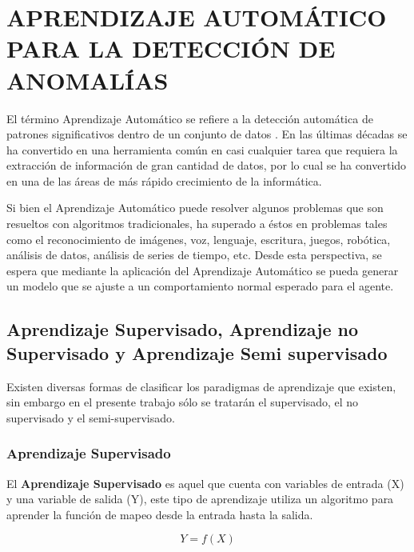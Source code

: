 \chapter{\uppercase{Aprendizaje Autom\'{a}tico para la detecci\'{o}n de anomal\'{i}as}}
\label{Capitulo 3}

El t\'{e}rmino Aprendizaje Autom\'{a}tico se refiere a la detecci\'{o}n autom\'{a}tica de patrones significativos dentro de un conjunto de datos \cite{Reference32}. En las \'{u}ltimas d\'{e}cadas se ha convertido en una herramienta com\'{u}n en casi cualquier tarea que requiera la extracci\'{o}n de informaci\'{o}n de gran cantidad de datos, por lo cual se ha convertido en una de las \'{a}reas de m\'{a}s r\'{a}pido crecimiento de la inform\'{a}tica.

\vspace{5mm} %

Si bien el Aprendizaje Autom\'{a}tico puede resolver algunos problemas que son resueltos con algoritmos tradicionales, ha superado a \'{e}stos en problemas tales como el reconocimiento de im\'{a}genes, voz, lenguaje, escritura, juegos, rob\'{o}tica, an\'{a}lisis de datos, an\'{a}lisis de series de tiempo, etc. Desde esta perspectiva, se espera que mediante la aplicaci\'{o}n del Aprendizaje Autom\'{a}tico se pueda generar un modelo que se ajuste a un comportamiento normal esperado para el agente.

\section{Aprendizaje Supervisado, Aprendizaje no Supervisado y Aprendizaje Semi supervisado}
\label{section|aprendizaje}

Existen diversas formas de clasificar los paradigmas de aprendizaje que existen, sin embargo en el presente trabajo s\'{o}lo se tratar\'{a}n el supervisado, el no supervisado y el semi-supervisado.

\subsection{Aprendizaje Supervisado}

El \textbf{Aprendizaje Supervisado} es aquel que cuenta con variables de entrada (X) y una variable de salida (Y), este tipo de aprendizaje utiliza un algoritmo para aprender la funci\'{o}n de mapeo desde la entrada hasta la salida.

\begin{equation}
Y = f(X)
\end{equation}

